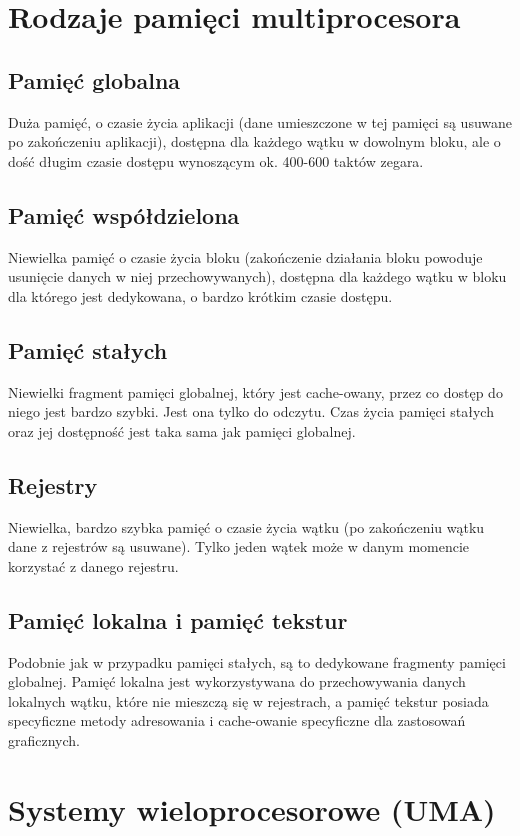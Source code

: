 \section{Rodzaje pamięci multiprocesora}
	\subsection{Pamięć globalna}
		Duża pamięć, o czasie życia aplikacji (dane umieszczone w tej pamięci są usuwane po zakończeniu aplikacji), dostępna dla każdego wątku w dowolnym bloku, ale o dość długim czasie dostępu wynoszącym ok. 400-600 taktów zegara.
	\subsection{Pamięć współdzielona}
		Niewielka pamięć o czasie życia bloku (zakończenie działania bloku powoduje usunięcie danych w niej przechowywanych), dostępna dla każdego wątku w bloku dla którego jest dedykowana, o bardzo krótkim czasie dostępu.
	\subsection{Pamięć stałych}
		Niewielki fragment pamięci globalnej, który jest cache-owany, przez co dostęp do niego jest bardzo szybki. Jest ona tylko do odczytu. Czas życia pamięci stałych oraz jej dostępność jest taka sama jak pamięci globalnej.
	\subsection{Rejestry}
		Niewielka, bardzo szybka pamięć o czasie życia wątku (po zakończeniu wątku dane z rejestrów są usuwane). Tylko jeden wątek może w danym momencie korzystać z danego rejestru.
	\subsection{Pamięć lokalna i pamięć tekstur}
		Podobnie jak w przypadku pamięci stałych, są to dedykowane fragmenty pamięci globalnej. Pamięć lokalna jest wykorzystywana do przechowywania danych lokalnych wątku, które nie mieszczą się w rejestrach, a pamięć tekstur posiada specyficzne metody adresowania i cache-owanie specyficzne dla zastosowań graficznych.

\section{Systemy wieloprocesorowe (UMA)}
